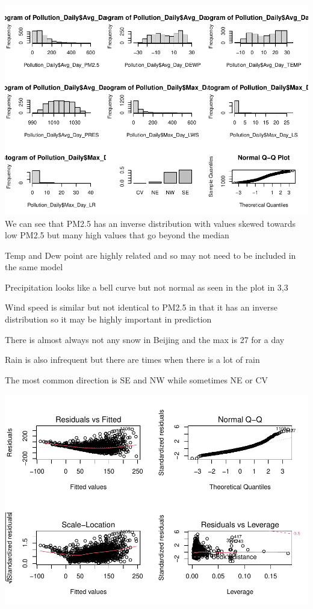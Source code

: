 \documentclass[
]{article}
\begin{document}
\includegraphics{Final_Project_1_files/figure-latex/unnamed-chunk-4-1.pdf}
We can see that PM2.5 has an inverse distribution with values skewed
towards low PM2.5 but many high values that go beyond the median

Temp and Dew point are highly related and so may not need to be included
in the same model

Precipitation looks like a bell curve but not normal as seen in the plot
in 3,3

Wind speed is similar but not identical to PM2.5 in that it has an
inverse distribution so it may be highly important in prediction

There is almost always not any snow in Beijing and the max is 27 for a
day

Rain is also infrequent but there are times when there is a lot of rain

The most common direction is SE and NW while sometimes NE or CV

\includegraphics{Final_Project_1_files/figure-latex/unnamed-chunk-5-1.pdf}
\end{document}

